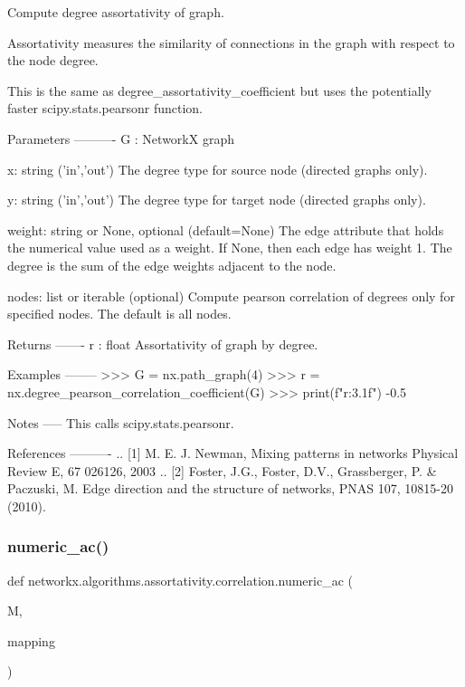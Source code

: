 \begin{DoxyVerb}Compute degree assortativity of graph.

Assortativity measures the similarity of connections
in the graph with respect to the node degree.

This is the same as degree_assortativity_coefficient but uses the
potentially faster scipy.stats.pearsonr function.

Parameters
----------
G : NetworkX graph

x: string ('in','out')
   The degree type for source node (directed graphs only).

y: string ('in','out')
   The degree type for target node (directed graphs only).

weight: string or None, optional (default=None)
   The edge attribute that holds the numerical value used
   as a weight.  If None, then each edge has weight 1.
   The degree is the sum of the edge weights adjacent to the node.

nodes: list or iterable (optional)
    Compute pearson correlation of degrees only for specified nodes.
    The default is all nodes.

Returns
-------
r : float
   Assortativity of graph by degree.

Examples
--------
>>> G = nx.path_graph(4)
>>> r = nx.degree_pearson_correlation_coefficient(G)
>>> print(f"{r:3.1f}")
-0.5

Notes
-----
This calls scipy.stats.pearsonr.

References
----------
.. [1] M. E. J. Newman, Mixing patterns in networks
       Physical Review E, 67 026126, 2003
.. [2] Foster, J.G., Foster, D.V., Grassberger, P. & Paczuski, M.
   Edge direction and the structure of networks, PNAS 107, 10815-20 (2010).
\end{DoxyVerb}
 \mbox{\label{namespacenetworkx_1_1algorithms_1_1assortativity_1_1correlation_af61efe96c03971b43acb9322acfcecb1}} 
\subsubsection{\texorpdfstring{numeric\+\_\+ac()}{numeric\_ac()}}
{\footnotesize\ttfamily def networkx.\+algorithms.\+assortativity.\+correlation.\+numeric\+\_\+ac (\begin{DoxyParamCaption}\item[{}]{M,  }\item[{}]{mapping }\end{DoxyParamCaption})}

